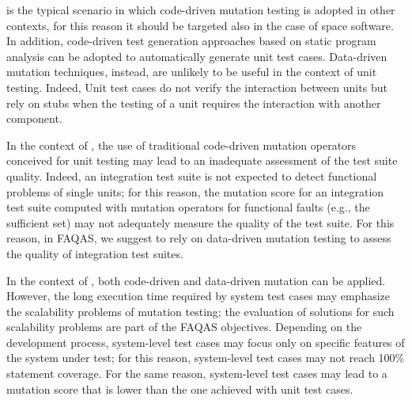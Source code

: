 
 is the typical scenario in which code-driven mutation testing is adopted in other contexts, for this reason it should be targeted also in the case of space software.
In addition, code-driven test generation approaches based on static program analysis can be adopted to automatically generate unit test cases.
Data-driven mutation techniques, instead, are unlikely to be useful in the context of unit testing.
Indeed, Unit test cases do not verify the interaction between units but rely on stubs when the testing of a unit requires the interaction with another component.

In the context of , the use of traditional code-driven mutation operators conceived for unit testing may lead to an inadequate assessment of the test suite quality.
Indeed, an integration test suite is not expected to detect functional problems of single units; for this reason, the mutation score for an integration test suite computed with mutation operators for functional faults (e.g., the sufficient set) may not adequately measure the quality of the test suite.
For this reason, in FAQAS, we suggest to rely on data-driven mutation testing to assess the quality of integration test suites.



In the context of , both code-driven and data-driven mutation can be applied. However, the long execution time required by system test cases may emphasize the scalability problems of mutation testing; the evaluation of solutions for such scalability problems are part of the FAQAS objectives.
Depending on the development process, system-level test cases may focus only on specific features of the system under test; for this reason, system-level test cases may not reach 100\% statement coverage. For the same reason, system-level test cases may lead to a mutation score that is lower than the one achieved with unit test cases.


